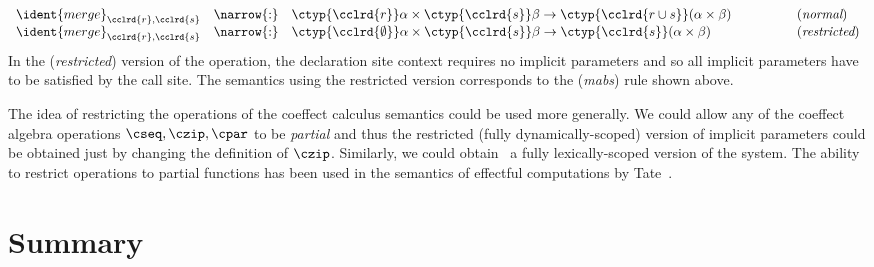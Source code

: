 \begin{equation*}
\begin{array}{rcll}
 \ident{merge}_{\cclrd{r}, \cclrd{s}} &\narrow{:}& \ctyp{\cclrd{r}}\alpha \times \ctyp{\cclrd{s}}\beta \rightarrow \ctyp{\cclrd{r \cup s}}(\alpha \times \beta)
 &\hspace{4em}(\textit{normal}) \\
 \ident{merge}_{\cclrd{r}, \cclrd{s}} &\narrow{:}& \ctyp{\cclrd{\emptyset}}\alpha \times \ctyp{\cclrd{s}}\beta \rightarrow \ctyp{\cclrd{s}}(\alpha \times \beta)
 &\hspace{4em}(\textit{restricted})
\end{array}
\end{equation*}
%
In the (\emph{restricted}) version of the operation, the declaration site context requires
no implicit parameters and so all implicit parameters have to be satisfied by the call site.
The semantics using the restricted version corresponds to the (\emph{mabs}) rule shown above.

The idea of restricting the operations of the coeffect calculus semantics could be used more
generally. We could allow any of the coeffect algebra operations $\cseq, \czip, \cpar$ to be
\emph{partial} and thus the restricted (fully dynamically-scoped) version of implicit parameters
could be obtained just by changing the definition of $\czip$. Similarly, we could obtain \eg~a
fully lexically-scoped version of the system. The ability to restrict operations to partial
functions has been used in the semantics of effectful computations by Tate~\cite{effects-producer-semantics}.



%
%

\section{Summary}

